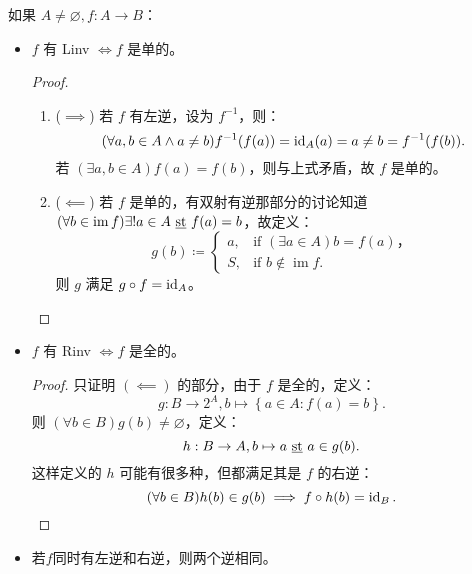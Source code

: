 \begin{itemize}
          如果 \(A \neq \varnothing, f:A\to B\)：
          \begin{itemize}
              \item \(f\) 有 Linv \(\iff f\) 是单的。
                    \begin{proof}{}
                        \begin{enumerate}
                            \item (\(\implies \)) 若 \(f\) 有左逆，设为 \(f^{-1} \)，则：
                                  \[
                                      (\forall a,b\in A\land a\neq b)f^{-1} (f(a)) = \operatorname{id}_A(a) = a \neq b = f^{-1} (f(b))
                                      .\]
                                  若 \((\exists a,b\in A)f(a) = f(b)\)，则与上式矛盾，故 \(f\) 是单的。
                            \item (\(\impliedby \)) 若 \(f\) 是单的，有双射有逆那部分的讨论知道 \((\forall b\in\operatorname{im}f)\exists !a \in A \text{ \underline{st} } f(a) = b\)，故定义：
                                  \[
                                      g(b)\coloneqq \begin{cases}
                                          a, & \text{if }(\exists a\in A)b = f(a)，    \\
                                          S, & \text{if } b \notin \operatorname{im}f.
                                      \end{cases}
                                  \]
                                  则 \(g\) 满足 \(g\circ f = \operatorname{id}_A\)。
                        \end{enumerate}
                    \end{proof}
              \item \(f\) 有 Rinv \(\iff f\) 是全的。
                    \begin{proof}{}
                        只证明 \((\impliedby )\) 的部分，由于 \(f\) 是全的，定义：
                        \[
                            g:B\to 2^A, b\mapsto  \left\{ a\in A : f(a) = b\right\}
                            .\]
                        则 \((\forall b\in B)g(b) \neq \varnothing\)，定义：
                        \[
                            h:B\to A, b \mapsto a \text{ \underline{st} } a   \in g(b)
                            .\]
                        这样定义的 \(h\) 可能有很多种，但都满足其是 \(f\) 的右逆：
                        \[
                            (\forall b\in B)h(b) \in g(b) \implies f\circ h(b) = \operatorname{id}_B
                            .\]
                    \end{proof}
              \item 若\(f\)同时有左逆和右逆，则两个逆相同。
          \end{itemize}
\end{itemize}

